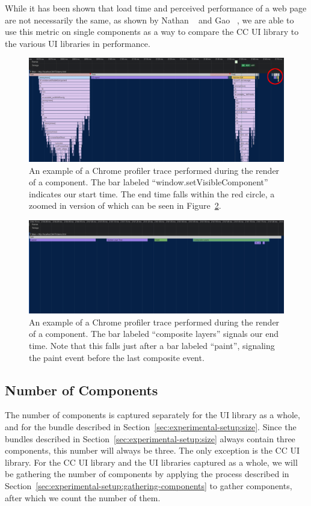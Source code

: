 While it has been shown that load time and perceived performance of a web page are not necessarily the same, as shown by Nathan \etal{}~\cite{nathan2018measuring} and Gao \etal{}~\cite{gao2017perceived}, we are able to use this metric on single components as a way to compare the CC UI library to the various UI libraries in performance.

\begin{figure}[h]
	\includegraphics[width=\columnwidth]{figures/experimental-setup/render-time-highlighted.png}
	\caption{An example of a Chrome profiler trace performed during the render of a component. The bar labeled ``window.setVisibleComponent'' indicates our start time. The end time falls within the red circle, a zoomed in version of which can be seen in Figure~\ref{fig:experimental-setup:render-time-end}.}
	\label{fig:experimental-setup:render-time-start}
	\centering
\end{figure}

\begin{figure}[h]
	\includegraphics[width=\columnwidth]{figures/experimental-setup/render-time-zoomed.png}
	\caption{An example of a Chrome profiler trace performed during the render of a component. The bar labeled ``composite layers'' signals our end time. Note that this falls just after a bar labeled ``paint'', signaling the paint event before the last composite event.}
	\label{fig:experimental-setup:render-time-end}
	\centering
\end{figure}

\subsection{Number of Components}
The number of components is captured separately for the UI library as a whole, and for the bundle described in Section~\ref{sec:experimental-setup:size}. Since the bundles described in Section~\ref{sec:experimental-setup:size} always contain three components, this number will always be three. The only exception is the CC UI library. For the CC UI library and the UI libraries captured as a whole, we will be gathering the number of components by applying the process described in Section~\ref{sec:experimental-setup:gathering-components} to gather components, after which we count the number of them.